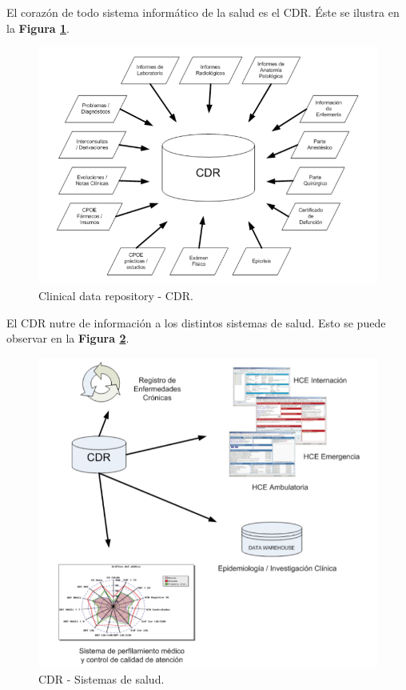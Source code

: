 El corazón de todo sistema informático de la salud es el CDR. Éste se ilustra en la \textbf{Figura \ref{cdr}}.

\begin{figure}
  \centering
  \includegraphics[width=.9\textwidth]{img/tp1/CDR}
  \caption{Clinical data repository - CDR.} 
  \label{cdr}
\end{figure}

El CDR nutre de información a los distintos sistemas de salud. Esto se puede observar en la \textbf{Figura \ref{cdr-hce}}.
\begin{figure}
  \centering
  \includegraphics[width=.9\textwidth]{img/tp1/CDR-HCE}
  \caption{CDR - Sistemas de salud.} 
  \label{cdr-hce}
\end{figure}
\clearpage
